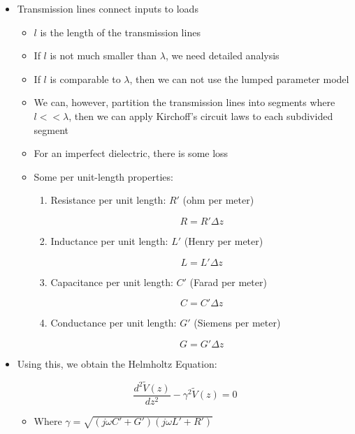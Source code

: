 \begin{itemize}

  \item Transmission lines connect inputs to loads

    \begin{itemize}

      \item $l$ is the length of the transmission lines

      \item If $l$ is not much smaller than $\lambda$, we need detailed analysis

      \item If $l$ is comparable to $\lambda$, then we can not use the lumped parameter model

      \item We can, however, partition the transmission lines into segments where $l<<\lambda$, then we can apply Kirchoff's circuit laws to each subdivided segment

      \item For an imperfect dielectric, there is some loss

      \item Some per unit-length properties:

        \begin{enumerate}

          \item Resistance per unit length: $R'$ (ohm per meter)

            $$\boxed{R=R'\Delta z}$$

          \item Inductance per unit length: $L'$ (Henry per meter)

            $$\boxed{L=L'\Delta z}$$

          \item Capacitance per unit length: $C'$ (Farad per meter)

            $$\boxed{C=C'\Delta z}$$

          \item Conductance per unit length: $G'$ (Siemens per meter)

            $$\boxed{G=G'\Delta z}$$

        \end{enumerate}

    \end{itemize}

  \item Using this, we obtain the Helmholtz Equation:

    $$\boxed{\frac{d^2 \tilde{V}(z)}{dz^2}-\gamma^2\tilde{V}(z)=0}$$

    \begin{itemize}

      \item Where $\gamma=\sqrt{(j\omega C' + G')(j\omega L' + R')}$

    \end{itemize}

\end{itemize}



